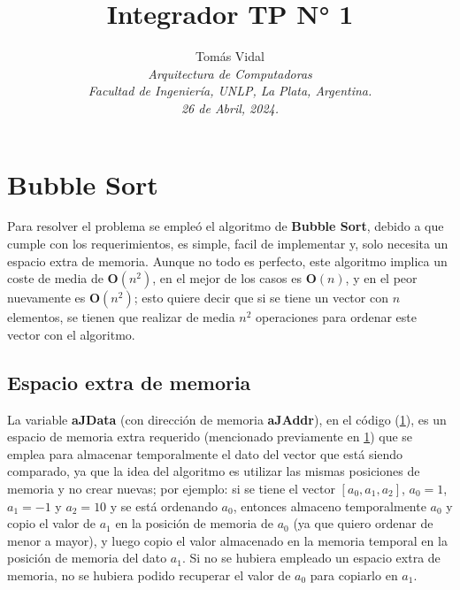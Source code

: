 \documentclass[letterpaper, 10 pt, conference]{ieeeconf}  %
\title{\LARGE \bf Integrador TP N° 1}
\author{
  Tom\'as Vidal\\
  {\it Arquitectura de Computadoras}\\
  {\it Facultad de Ingenier\'ia, UNLP, La Plata, Argentina.}\\
  {\it 26 de Abril, 2024.}
}                                            %
\begin{document}
\maketitle
\thispagestyle{empty}
\pagestyle{empty}


\section{Bubble Sort} \label{sec:bubble_sort}
Para resolver el problema se empleó el algoritmo de \textbf{Bubble Sort}, debido a que cumple con los requerimientos, es simple, facil de implementar y, solo necesita un espacio extra de memoria. Aunque no todo es perfecto, este algoritmo implica un coste de media de $\textbf{O}(n^{2})$, en el mejor de los casos es $\textbf{O}(n)$, y en el peor nuevamente es $\textbf{O}(n^{2})$; esto quiere decir que si se tiene un vector con $n$ elementos, se tienen que realizar de media $n^{2}$ operaciones para ordenar este vector con el algoritmo.

\subsection{Espacio extra de memoria}
La variable \textbf{aJData} (con dirección de memoria \textbf{aJAddr}), en el código (\ref{sec:bubble_sort}), es un espacio de memoria extra requerido (mencionado previamente en \ref{sec:bubble_sort}) que se emplea para almacenar temporalmente el dato del vector que está siendo comparado, ya que la idea del algoritmo es utilizar las mismas posiciones de memoria y no crear nuevas; por ejemplo: si se tiene el vector $[a_0, a_1, a_2]$, $a_0=1$, $a_1=-1$ y $a_2=10$ y se está ordenando $a_0$, entonces almaceno temporalmente $a_0$ y copio el valor de $a_1$ en la posición de memoria de $a_0$ (ya que quiero ordenar de menor a mayor), y luego copio el valor almacenado en la memoria temporal en la posición de memoria del dato $a_1$. Si no se hubiera empleado un espacio extra de memoria, no se hubiera podido recuperar el valor de $a_0$ para copiarlo en $a_1$.
\end{document}
